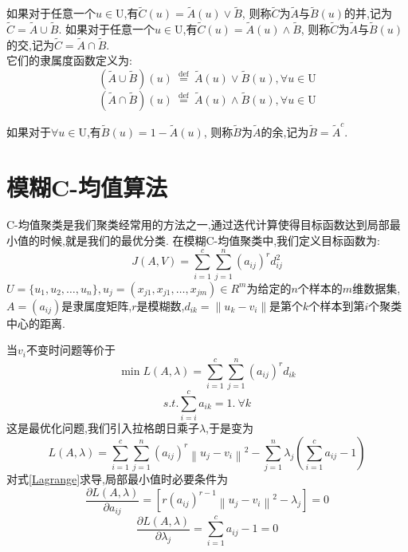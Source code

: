 \begin{definition}
    如果对于任意一个$u \in \mathrm{U}$,有$\tilde{C}(u)=\tilde{A}(u) \vee \tilde{B}$,
    则称$\tilde{C}$为$\tilde{A}$与$\tilde{B}(u)$的并,记为$\tilde{C}=\tilde{A} \cup \tilde{B}$.
    如果对于任意一个$u \in \mathrm{U}$,有$\tilde{C}(u)=\tilde{A}(u) \wedge \tilde{B}$,
    则称$\tilde{C}$为$\tilde{A}$与$\tilde{B}(u)$的交,记为$\tilde{C}=\tilde{A} \cap \tilde{B}$.\\
    它们的隶属度函数定义为:
    \[
        (\tilde{A}\cup  \tilde{B})(u) \stackrel{\text { def }}{=}\tilde{A}(u) \vee \tilde{B}(u) , \forall u \in \mathrm{U}
    \]
    \[
        (\tilde{A}\cap   \tilde{B})(u) \stackrel{\text { def }}{=}\tilde{A}(u) \wedge \tilde{B}(u) ,\forall u \in \mathrm{U}
    \]
\end{definition}
\begin{definition}
    如果对于$\forall u \in \mathrm{U}$,有$\tilde{B}(u)=1-\tilde{A}(u) $,
    则称$\tilde{B}$为$\tilde{A}$的余,记为$\tilde{B}=\tilde{A}^c$.
\end{definition}
\section{模糊C-均值算法}
C-均值聚类是我们聚类经常用的方法之一,通过迭代计算使得目标函数达到局部最小值的时候,就是我们的最优分类.
在模糊C-均值聚类中,我们定义目标函数为:
\begin{equation}
    J(A, V)=\sum_{i=1}^{c} \sum_{j=1}^{n}\left(a_{i j}\right)^{r} d_{i j}^2
\end{equation}
$U=\{u_1,u_2,\dots,u_n\},u_j=(x_{j1},x_{j1},\dots,x_{jm})\in R^m$为给定的$n$个样本的$m$维数据集,
$A=(a_{i j})$是隶属度矩阵,$r$是模糊数,$d_{i k}=\| u_k-v_i\|$是第个$k$个样本到第$i$个聚类中心的距离.
\par
当$v_i$不变时问题等价于
\begin{equation}
    \min L(A, \lambda)=\sum_{i=1}^{c} \sum_{j=1}^{n}\left(a_{i j}\right)^{r}d_{i k}
\end{equation}
\begin{equation}
    s.t.  \sum_{i=i}^c a_{i k}=1.\  \forall k
\end{equation}
这是最优化问题,我们引入拉格朗日乘子$\lambda$,于是变为
\begin{equation}
    L(A, \lambda)=\sum_{i=1}^{c} \sum_{j=1}^{n}\left(a_{i j}\right)^{r}\left\|u_{j}-v_{i}\right\|^{2}-\sum_{j=1}^{n} \lambda_{j}\left(\sum_{i=1}^{c} a_{i j}-1\right)
    \label{Lagrange}
\end{equation}
对式\ref{Lagrange}求导,局部最小值时必要条件为
\begin{equation}
    \frac{\partial L(A, \lambda)}{\partial a_{i j}}=\left[r\left(a_{i j}\right)^{r-1}\left\|u_{j}-v_{i}\right\|^{2}-\lambda_{j}\right]=0
    \label{dLdAij}
\end{equation}
\begin{equation}
    \frac{\partial L(A, \lambda)}{\partial \lambda_{j}}=\sum_{i=1}^{c} a_{i j}-1=0
    \label{dLdLamda}
\end{equation}

